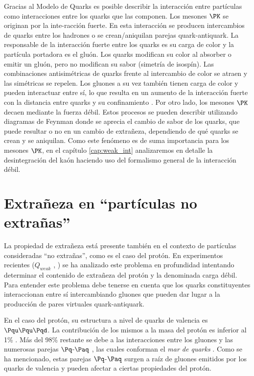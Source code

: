 Gracias al Modelo de Quarks es posible describir la interacción entre partículas como interacciones entre los quarks que las componen. Los mesones $\PK$ se originan por la inte-racción fuerte. En esta interacción se producen intercambios de quarks entre los hadrones o se crean/aniquilan parejas quark-antiquark. La responsable de la interacción fuerte entre los quarks es su carga de color y la partícula portadora es el gluón.  Los quarks modifican su color al absorber o emitir un gluón, pero no modifican su sabor (simetría de isospín). Las combinaciones antisimétricas de quarks frente al intercambio de color se atraen y las simétricas se repelen. Los gluones a su vez también tienen carga de color y pueden interactuar entre sí, lo que resulta en un aumento de la interacción fuerte con la distancia entre quarks y su confinamiento \cite{notas2020}. Por otro lado, los mesones $\PK$ decaen mediante la fuerza débil. Estos procesos se pueden describir utilizando diagramas de Feynman donde se aprecia el cambio de sabor de los quarks, que puede resultar o no en un cambio de extrañeza, dependiendo de qué quarks se crean y se aniquilan. Como este fenómeno es de suma importancia para los mesones $\PK$, en el capítulo \ref{cap:weak_int} analizaremos en detalle la desintegración del kaón haciendo uso del formalismo general de la interacción débil.\\

\section{Extrañeza en ``partículas no extrañas''}
\label{cap:non-strange_particles}
La propiedad de extrañeza está presente también en el contexto de partículas consideradas ``no extrañas'', como es el caso del protón. En experimentos recientes ($Q_{weak}$ \cite{nuruzzaman}, \cite{carlini}) se ha analizado este problema en profundidad intentando determinar el contenido de extrañeza del protón y la denominada carga débil. Para entender este problema debe tenerse en cuenta que los quarks constituyentes interaccionan entre sí intercambiando gluones que pueden dar lugar a la producción de pares virtuales quark-antiquark.

En el caso del protón, su estructura a nivel de quarks de valencia es $\Pqu\Pqu\Pqd$. La contribución de los mismos a la masa del protón es inferior al 1\% \cite{Roberts}. Más del 98\% restante se debe a las interacciones entre los gluones y las numerosas parejas $\Pq$-$\Paq$ \cite{Walker}, las cuales conforman el \textit{mar de quarks} \cite{Halzen}. Como se ha mencionado, estas parejas $\Pq$-$\Paq$ surgen a raíz de gluones emitidos por los quarks de valencia \cite{Donelly} y pueden afectar a ciertas propiedades del protón. 

